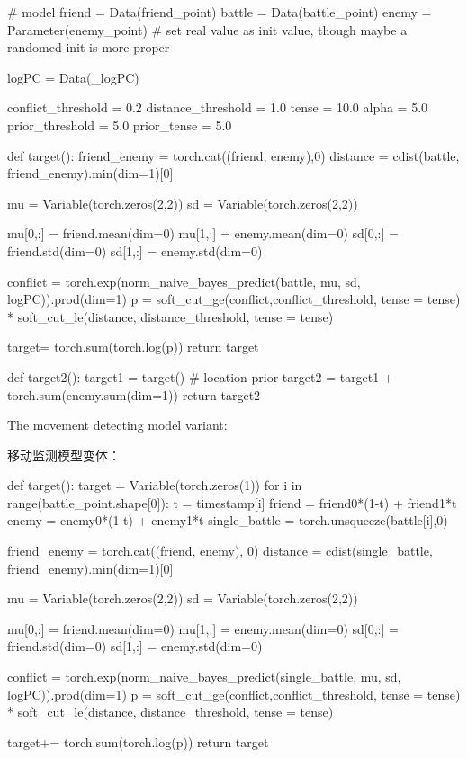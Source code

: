 \documentclass{article}
\begin{document}
\begin{python}

# model
friend = Data(friend_point)
battle = Data(battle_point)
enemy = Parameter(enemy_point) # set real value as init value, though maybe a randomed init is more proper

logPC = Data(_logPC)

conflict_threshold = 0.2
distance_threshold = 1.0
tense = 10.0
alpha = 5.0
prior_threshold = 5.0
prior_tense = 5.0

def target():
    friend_enemy = torch.cat((friend, enemy),0)
    distance = cdist(battle, friend_enemy).min(dim=1)[0]
    

    mu = Variable(torch.zeros(2,2)) 
    sd = Variable(torch.zeros(2,2))
    
    mu[0,:] = friend.mean(dim=0)
    mu[1,:] = enemy.mean(dim=0)
    sd[0,:] = friend.std(dim=0)
    sd[1,:] = enemy.std(dim=0)
    
    conflict = torch.exp(norm_naive_bayes_predict(battle, mu, sd, logPC)).prod(dim=1)
    p = soft_cut_ge(conflict,conflict_threshold, tense = tense) * soft_cut_le(distance, distance_threshold, tense = tense)
    
    target= torch.sum(torch.log(p))
    return target

def target2():
    target1 = target()
    # location prior
    target2 = target1 + torch.sum(enemy.sum(dim=1))
    return target2

\end{python}

The movement detecting model variant:

移动监测模型变体：

\begin{python}
def target():
    target = Variable(torch.zeros(1))
    for i in range(battle_point.shape[0]):
        t = timestamp[i]
        friend = friend0*(1-t) + friend1*t
        enemy = enemy0*(1-t) + enemy1*t
        single_battle = torch.unsqueeze(battle[i],0) 
        
        friend_enemy = torch.cat((friend, enemy), 0)
        distance = cdist(single_battle, friend_enemy).min(dim=1)[0]
        
        mu = Variable(torch.zeros(2,2)) 
        sd = Variable(torch.zeros(2,2))

        mu[0,:] = friend.mean(dim=0)
        mu[1,:] = enemy.mean(dim=0)
        sd[0,:] = friend.std(dim=0)
        sd[1,:] = enemy.std(dim=0)

        conflict = torch.exp(norm_naive_bayes_predict(single_battle, mu, sd, logPC)).prod(dim=1)
        p = soft_cut_ge(conflict,conflict_threshold, tense = tense) * soft_cut_le(distance, distance_threshold, tense = tense)

        target+= torch.sum(torch.log(p))
    return target

\end{python}
\end{document}
